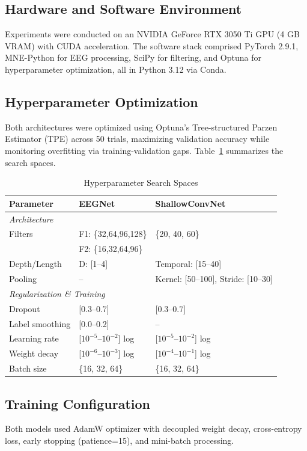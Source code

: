 \subsection{Hardware and Software Environment}
Experiments were conducted on an NVIDIA GeForce RTX 3050 Ti GPU (4 GB VRAM) with CUDA acceleration. The software stack comprised PyTorch 2.9.1, MNE-Python for EEG processing, SciPy for filtering, and Optuna for hyperparameter optimization, all in Python 3.12 via Conda.

\subsection{Hyperparameter Optimization}
Both architectures were optimized using Optuna's Tree-structured Parzen Estimator (TPE) across 50 trials, maximizing validation accuracy while monitoring overfitting via training-validation gaps. Table~\ref{tab:hyperparams_combined} summarizes the search spaces.

\begin{table}[H]
\centering
\small
\caption{Hyperparameter Search Spaces}
\label{tab:hyperparams_combined}
\renewcommand{\arraystretch}{1.1}
\begin{tabular}{|l|l|l|}
\hline
\textbf{Parameter} & \textbf{EEGNet} & \textbf{ShallowConvNet} \\
\hline
\multicolumn{3}{|l|}{\textit{Architecture}} \\
\hline
Filters & F1: \{32,64,96,128\} & \{20, 40, 60\} \\
& F2: \{16,32,64,96\} & \\
Depth/Length & D: [1--4] & Temporal: [15--40] \\
Pooling & -- & Kernel: [50--100], Stride: [10--30] \\
\hline
\multicolumn{3}{|l|}{\textit{Regularization \& Training}} \\
\hline
Dropout & [0.3--0.7] & [0.3--0.7] \\
Label smoothing & [0.0--0.2] & -- \\
Learning rate & [$10^{-5}$--$10^{-2}$] log & [$10^{-5}$--$10^{-2}$] log \\
Weight decay & [$10^{-6}$--$10^{-3}$] log & [$10^{-4}$--$10^{-1}$] log \\
Batch size & \{16, 32, 64\} & \{16, 32, 64\} \\
\hline
\end{tabular}
\end{table}

\subsection{Training Configuration}
Both models used AdamW optimizer with decoupled weight decay, cross-entropy loss, early stopping (patience=15), and mini-batch processing.

